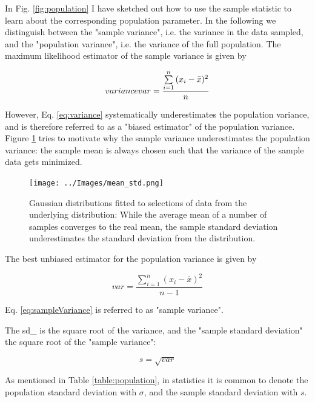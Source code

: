 In Fig. \ref{fig:population} I have sketched out how to use the sample statistic to learn about the corresponding population parameter. In the following we distinguish between the "sample variance", i.e. the variance in the data sampled, and the "population variance", i.e. the variance of the full population. The maximum likelihood estimator of the sample \gls{variance} is given by

\begin{equation}\label{eq:variance} \index{general}{variance}
  var = \frac{{\sum\limits_{i = 1}^n {({x_i-\bar{x}})^2} }}{n}
\end{equation}

However, Eq. \ref{eq:variance} systematically underestimates the population variance, and is therefore referred to as a "biased estimator" of the population variance. Figure \ref{fig:mean_std} tries to motivate why the sample variance underestimates the population variance: the sample mean is always chosen such that the variance of the sample data gets minimized.

\begin{figure}[ht]
  \centering
  \texttt{[image: ../Images/mean\_std.png]}\\
  \caption{Gaussian distributions fitted to selections of data from the underlying distribution: While the average mean of a number of samples converges to the real mean, the sample standard deviation underestimates the standard deviation from the distribution.}\label{fig:mean_std}
\end{figure}

The best unbiased estimator for the population variance is given by

\begin{equation}\label{eq:sampleVariance}
  var = \frac{{\sum\limits_{i = 1}^n {({x_i-\bar{x}})^2} }}{n-1}
\end{equation}

Eq. \ref{eq:sampleVariance} is referred to as "sample variance".

The \gls{sd_}  is the square root of the variance, and the
"sample standard deviation" the square root of the "sample variance":

\begin{equation}
  s = \sqrt{var}
\end{equation}

As mentioned in Table \ref{table:population}, in statistics it is common to denote the population standard deviation with $\sigma$, and the sample standard deviation with $s$.

